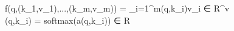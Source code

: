 f(q,(k_1,v_1),...,(k_m,v_m)) = \sum_{i=1}^{m}\alpha(q,k_i)v_i ∈ R^v \\ \alpha(q,k_i) = softmax(a(q,k_i)) ∈ R
